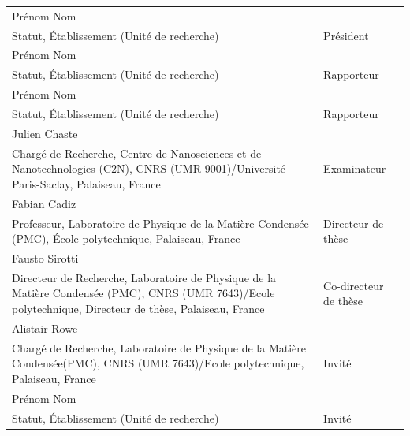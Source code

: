 \documentclass[a4paper]{article}
\newcommand{\jurynameA}{Prénom Nom}
\newcommand{\juryadressA}{Statut, Établissement (Unité de recherche)}
\newcommand{\juryroleA}{Président}
\newcommand{\jurynameB}{Prénom Nom}
\newcommand{\juryadressB}{Statut, Établissement (Unité de recherche)}
\newcommand{\juryroleB}{Rapporteur}
\newcommand{\jurynameC}{Prénom Nom}
\newcommand{\juryadressC}{Statut, Établissement (Unité de recherche)}
\newcommand{\juryroleC}{Rapporteur}
\newcommand{\jurynameD}{Julien Chaste}
\newcommand{\juryadressD}{Chargé de Recherche, Centre de Nanosciences et de Nanotechnologies (C2N), CNRS (UMR 9001)/Université Paris-Saclay, Palaiseau, France}
\newcommand{\juryroleD}{Examinateur}
\newcommand{\jurynameE}{Fabian Cadiz}
\newcommand{\juryadressE}{Professeur, Laboratoire de Physique de la Matière Condensée (PMC), École polytechnique, Palaiseau, France}
\newcommand{\juryroleE}{Directeur de thèse}
\newcommand{\jurynameF}{Fausto Sirotti}
\newcommand{\juryadressF}{Directeur de Recherche, Laboratoire de Physique de la Matière
Condensée (PMC), CNRS (UMR 7643)/Ecole polytechnique, Directeur de thèse, Palaiseau, France}
\newcommand{\juryroleF}{Co-directeur de thèse}
\newcommand{\jurynameG}{Alistair Rowe}
\newcommand{\juryadressG}{Chargé de Recherche, Laboratoire de Physique de la Matière Condensée(PMC), CNRS (UMR 7643)/Ecole polytechnique, Palaiseau, France}
\newcommand{\juryroleG}{Invité}
\newcommand{\jurynameH}{Prénom Nom}
\newcommand{\juryadressH}{Statut, Établissement (Unité de recherche)}
\newcommand{\juryroleH}{Invité}
\begin{document}
\begin{textblock}{10}
	\label{jury} 																				%
	\begin{flushleft}
	\begin{tabular}{@{} L{9.64cm} R{4.5cm}}
		\jurynameA  \\ \juryadressA & \juryroleA \\[5pt]
		\jurynameB  \\ \juryadressB & \juryroleB \\[5pt]
		\jurynameC  \\ \juryadressC & \juryroleC \\[5pt]
		\jurynameD  \\ \juryadressD & \juryroleD \\[5pt]
		\jurynameE  \\ \juryadressE & \juryroleE \\[5pt]
		\jurynameF  \\ \juryadressF & \juryroleF \\[5pt]
		\jurynameG  \\ \juryadressG & \juryroleG \\[5pt]
		\jurynameH  \\ \juryadressH & \juryroleH \\[5pt]
	\end{tabular} 
	\end{flushleft}   
\end{textblock}
\end{document}
